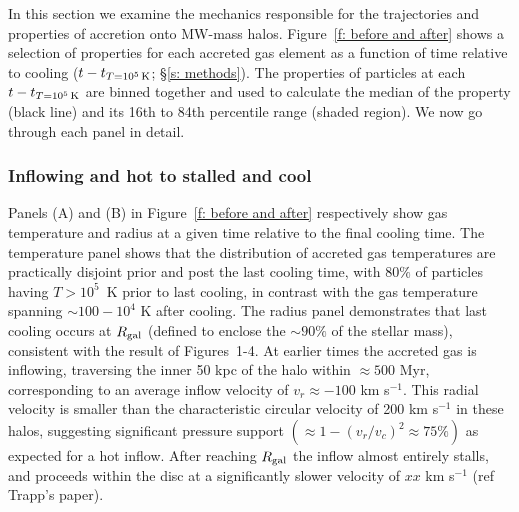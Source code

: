 \documentclass[fleqn,usenatbib]{mnras}
\newcommand{\tcon}{t_{T=10^5\,{\rm K}}}
\begin{document}
In this section we examine the mechanics responsible for the trajectories and properties of accretion onto MW-mass halos.
Figure~\ref{f: before and after} shows a selection of properties for each accreted gas element as a function of time relative to cooling  ($t - \tcon$; \S\ref{s: methods}).
The properties of particles at each $t - \tcon$ are binned together and used to calculate the median of the property (black line) and its 16th to 84th percentile range (shaded region).
We now go through each panel in detail.

\subsubsection{Inflowing and hot to stalled and cool}
\label{s: mechanics -- temp and radius}
Panels (A) and (B) in Figure~\ref{f: before and after} respectively show gas temperature and radius at a given time relative to the final cooling time.
The temperature panel shows that the distribution of accreted gas temperatures are practically disjoint prior and post the last cooling time, with $80\%$ of particles having $T > 10^5$~K prior to last cooling, in contrast with the gas temperature spanning $\sim100- 10^4$ K after cooling. 
The radius panel demonstrates that last cooling occurs at $R_{\rm gal}$ (defined to enclose the $\sim90\%$ of the stellar mass), consistent with the result of  Figures~1-4.
At earlier times the accreted gas is inflowing, traversing the inner 50 kpc of the halo within $\approx500$ Myr, corresponding to an average inflow velocity of $v_r\approx-100$ km s$^{-1}$.
This radial velocity is smaller than the characteristic circular velocity of 200 km s$^{-1}$ in these halos, suggesting significant pressure support $(\approx1-(v_r/v_c)^2\approx75\%)$ as expected for a hot inflow.
After reaching $R_{\rm gal}$ the inflow almost entirely stalls, and proceeds within the disc at a significantly slower velocity of $xx$ km s$^{-1}$ (ref Trapp's paper). 
\end{document}
